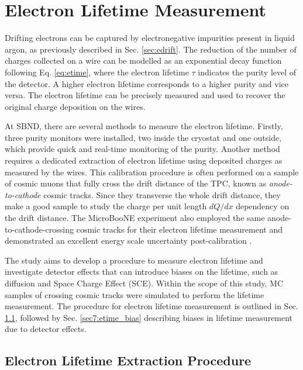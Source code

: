 \newpage
\section{Electron Lifetime Measurement}
\label{sec7:etime}

Drifting electrons can be captured by electronegative impurities present in liquid argon, as previously described in Sec. \ref{sec:edrift}.
The reduction of the number of charges collected on a wire can be modelled as an exponential decay function following Eq. \ref{eq:etime}, where the electron lifetime $\tau$ indicates the purity level of the detector.
A higher electron lifetime corresponds to a higher purity and vice versa.
The electron lifetime can be precisely measured and used to recover the original charge deposition on the wires.

At SBND, there are several methods to measure the electron lifetime.
Firstly, three purity monitors were installed, two inside the cryostat and one outside, which provide quick and real-time monitoring of the purity.
Another method requires a dedicated extraction of electron lifetime using deposited charges as measured by the wires.
This calibration procedure is often performed on a sample of cosmic muons that fully cross the drift distance of the TPC, known as \textit{anode-to-cathode} cosmic tracks.
Since they transverse the whole drift distance, they make a good sample to study the charge per unit length $dQ/dx$ dependency on the drift distance.
The MicroBooNE experiment also employed the same anode-to-cathode-crossing cosmic tracks for their electron lifetime measurement and demonstrated an excellent energy scale uncertainty post-calibration \cite{uboone_calib}.

The study aims to develop a procedure to measure electron lifetime and investigate detector effects that can introduce biases on the lifetime, such as diffusion and Space Charge Effect (SCE).
Within the scope of this study, MC samples of crossing cosmic tracks were simulated to perform the lifetime measurement.
The procedure for electron lifetime measurement is outlined in Sec. \ref{sec7:etime_procedure}, followed by Sec. \ref{sec7:etime_bias} describing biases in lifetime measurement due to detector effects.


\subsection{Electron Lifetime Extraction Procedure}
\label{sec7:etime_procedure}

